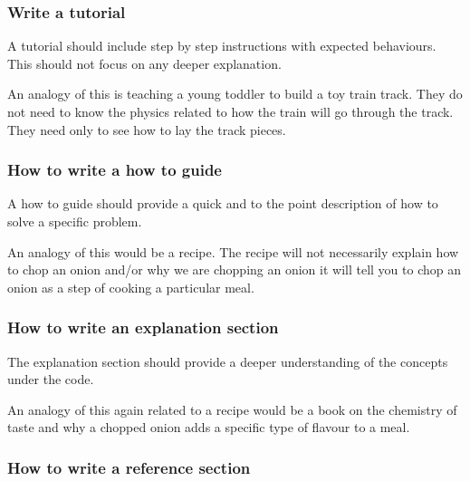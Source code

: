 \subsubsection{Write a tutorial}

A tutorial should include step by step instructions with expected behaviours.
This should not focus on any deeper explanation.

An analogy of this is teaching a young toddler to build a toy train
track. They do not need to know the physics related to how the train will go
through the track. They need only to see how to lay the track pieces.

\subsubsection{How to write a how to guide}
\label{\detokenize{building-tools/06-documentation/how/main:how-to-write-a-how-to-guide}}\label{\detokenize{building-tools/06-documentation/how/main:id2}}

A how to guide should provide a quick and to the point description of how to
solve a specific problem.

An analogy of this would be a recipe. The recipe will not necessarily explain
how to chop an onion and/or why we are chopping an onion it will tell you
to chop an onion as a step of cooking a particular meal.

\subsubsection{How to write an explanation section}
\label{\detokenize{building-tools/06-documentation/how/main:how-to-write-an-explanation-section}}\label{\detokenize{building-tools/06-documentation/how/main:id3}}

The explanation section should provide a deeper understanding of the concepts
under the code.

An analogy of this again related to a recipe would be a book on the chemistry of
taste and why a chopped onion adds a specific type of flavour to a meal.

\subsubsection{How to write a reference section}
\label{\detokenize{building-tools/06-documentation/how/main:how-to-write-a-reference-section}}\label{\detokenize{building-tools/06-documentation/how/main:id4}}

